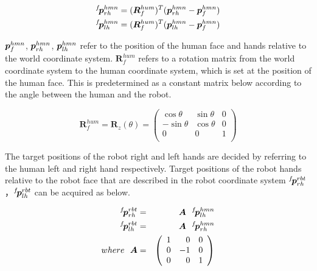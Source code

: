 \vspace{-3mm}
\begin{align}
^{f}\!\mbox{\boldmath $p$}^{hmn}_{rh} &= (\bm{R}^{hum}_{f})^{T}(\mbox{\boldmath $p$}^{hmn}_{rh} - \mbox{\boldmath $p$}^{hmn}_{f})\\
^{f}\!\mbox{\boldmath $p$}^{hmn}_{lh} &= (\bm{R}^{hum}_{f})^{T}(\mbox{\boldmath $p$}^{hmn}_{lh} - \mbox{\boldmath $p$}^{hmn}_{f})
\end{align}

\(\mbox{\boldmath $p$}^{hmn}_{f}\), \(\mbox{\boldmath $p$}^{hmn}_{rh}\), \(\mbox{\boldmath $p$}^{hmn}_{lh}\) refer to the position of the human face and hands relative to the world coordinate system. \(\bm{R}^{hum}_{f}\) refers to a rotation matrix from the world coordinate system to the human coordinate system, which is set at the position of the human face. This is predetermined as a constant matrix below according to the angle between the human and the robot.

\vspace{-3mm}
\begin{equation}
  \bm{R}^{hum}_{f} = \bm{R}_z(\theta)
  =
  \left(
  \begin{array}{rrr}
    \cos{\theta} & \sin{\theta} & 0\\
    -\sin{\theta} & \cos{\theta} & 0\\
    0 &            0 & 1\\
  \end{array}
  \right)
\end{equation}

The target positions of the robot right and left hands are decided by referring to the human left and right hand respectively. Target positions of the robot hands relative to the robot face that are described in the robot coordinate system \(^{f}\!\mbox{\boldmath $p$}^{rbt}_{rh}\)，\(^{f}\!\mbox{\boldmath $p$}^{rbt}_{lh}\) can be acquired as below.

\vspace{-3mm}
\begin{eqnarray}
  ^{f}\!\vector{p}^{rbt}_{rh} &=& \bm{A} \ \ ^{f}\!\vector{p}^{hmn}_{lh}\\
  ^{f}\!\vector{p}^{rbt}_{lh} &=& \bm{A} \ \ ^{f}\!\vector{p}^{hmn}_{rh}\\
  where \ \ \bm{A} &=&
  \left(
  \begin{array}{rrr}
    1 &  0 & 0\\
    0 & -1 & 0\\
    0 &  0 & 1\\
  \end{array}
  \right) \nonumber
  \label{equation:robot_hand_pos_ref_robot_face}
\end{eqnarray}

